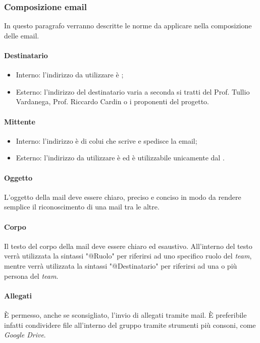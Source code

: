 \subsubsection{Composizione email}
In questo paragrafo verranno descritte le norme da applicare nella 
composizione delle email.
\paragraph{Destinatario}
\begin{itemize}
  \item Interno: l'indirizzo da utilizzare è \textit{\email};
  \item Esterno: l'indirizzo del destinatario varia a seconda si tratti del 
  Prof. Tullio Vardanega, Prof. Riccardo Cardin o i proponenti del progetto.
\end{itemize}
\paragraph{Mittente}
\begin{itemize}
  \item Interno: l'indirizzo è di colui che scrive e spedisce la email;
  \item Esterno: l'indirizzo da utilizzare è \textit{\email} ed è utilizzabile 
  unicamente dal \textit{\RdP}.
\end{itemize}
\paragraph{Oggetto}
L'oggetto della mail deve essere chiaro, preciso e conciso in modo da rendere 
semplice il riconoscimento di una mail tra le altre.
\paragraph{Corpo}
Il testo del corpo della mail deve essere chiaro ed esaustivo. All'interno del 
testo verrà utilizzata la sintassi "@Ruolo" per riferirsi ad uno specifico 
ruolo del \textit{team}, mentre verrà utilizzata la sintassi "@Destinatario" per 
riferirsi ad una o più persona del \textit{team}.
\paragraph{Allegati}
È permesso, anche se sconsigliato, l'invio di allegati tramite mail. È 
preferibile infatti condividere file all'interno del gruppo tramite strumenti più consoni, come \textit{Google 
Drive}. 
